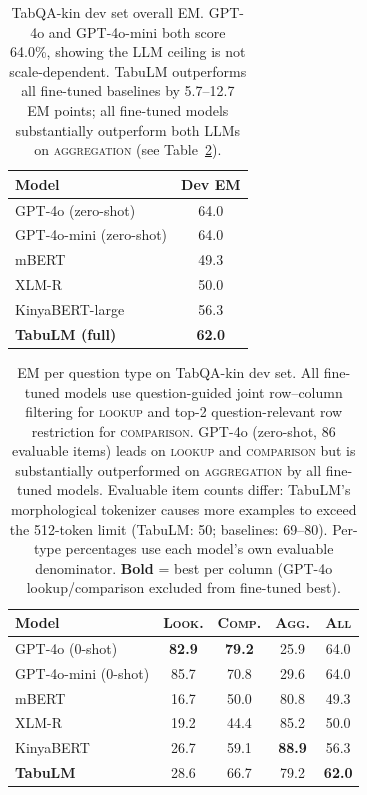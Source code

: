 \documentclass[11pt]{article}
\newcommand{\res}[1]{\textbf{#1}}
\begin{document}
\begin{table}[t]
\centering
\small
\begin{tabular}{lc}
\toprule
\textbf{Model} & \textbf{Dev EM} \\
\midrule
GPT-4o (zero-shot)         & 64.0 \\
GPT-4o-mini (zero-shot)    & 64.0 \\
\midrule
mBERT                      & 49.3 \\
XLM-R                      & 50.0 \\
KinyaBERT-large            & 56.3 \\
\midrule
\textbf{TabuLM (full)}     & \res{62.0} \\
\bottomrule
\end{tabular}
\caption{TabQA-kin dev set overall EM. GPT-4o and GPT-4o-mini both score 64.0\%, showing the LLM ceiling is not scale-dependent. TabuLM outperforms all fine-tuned baselines by 5.7--12.7 EM points; all fine-tuned models substantially outperform both LLMs on \textsc{aggregation} (see Table~\ref{tab:per_type}).}
\label{tab:main_results}
\end{table}

\begin{table}[t]
\centering
\small
\begin{tabular}{lcccc}
\toprule
\textbf{Model} & \textsc{Look.} & \textsc{Comp.} & \textsc{Agg.} & \textsc{All} \\
\midrule
GPT-4o (0-shot)     & \res{82.9} & \res{79.2} & 25.9 & 64.0 \\
GPT-4o-mini (0-shot)& 85.7 & 70.8 & 29.6 & 64.0 \\
\midrule
mBERT          & 16.7 & 50.0 & 80.8 & 49.3 \\
XLM-R          & 19.2 & 44.4 & 85.2 & 50.0 \\
KinyaBERT      & 26.7 & 59.1 & \res{88.9} & 56.3 \\
\textbf{TabuLM}& 28.6 & 66.7 & 79.2 & \res{62.0} \\
\bottomrule
\end{tabular}
\caption{EM per question type on TabQA-kin dev set. All fine-tuned models use question-guided joint row--column filtering for \textsc{lookup} and top-2 question-relevant row restriction for \textsc{comparison}. GPT-4o (zero-shot, 86 evaluable items) leads on \textsc{lookup} and \textsc{comparison} but is substantially outperformed on \textsc{aggregation} by all fine-tuned models. Evaluable item counts differ: TabuLM's morphological tokenizer causes more examples to exceed the 512-token limit (TabuLM: 50; baselines: 69--80). Per-type percentages use each model's own evaluable denominator. \textbf{Bold} = best per column (GPT-4o lookup/comparison excluded from fine-tuned best).}
\label{tab:per_type}
\end{table}
\end{document}
